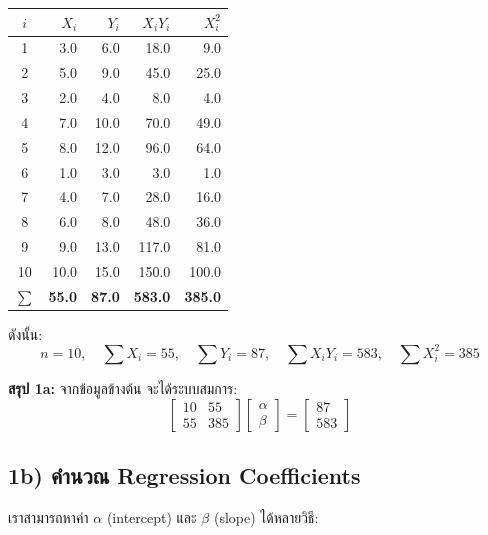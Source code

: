 \documentclass[12pt,a4paper]{article}
\begin{document}
\begin{table}[H]
\centering
\begin{tabular}{c r r r r}
\toprule
$i$ & $X_i$ & $Y_i$ & $X_i Y_i$ & $X_i^2$ \\
\midrule
1  & 3.0  & 6.0  & 18.0   & 9.0   \\
2  & 5.0  & 9.0  & 45.0   & 25.0  \\
3  & 2.0  & 4.0  & 8.0    & 4.0   \\
4  & 7.0  & 10.0 & 70.0   & 49.0  \\
5  & 8.0  & 12.0 & 96.0   & 64.0  \\
6  & 1.0  & 3.0  & 3.0    & 1.0   \\
7  & 4.0  & 7.0  & 28.0   & 16.0  \\
8  & 6.0  & 8.0  & 48.0   & 36.0  \\
9  & 9.0  & 13.0 & 117.0  & 81.0  \\
10 & 10.0 & 15.0 & 150.0  & 100.0 \\
\midrule
$\sum$ & \textbf{55.0} & \textbf{87.0} & \textbf{583.0} & \textbf{385.0} \\
\bottomrule
\end{tabular}
\end{table}

ดังนั้น:
\[
    n = 10, \quad
    \sum X_i = 55, \quad
    \sum Y_i = 87, \quad
    \sum X_i Y_i = 583, \quad
    \sum X_i^2 = 385
\]

\begin{ansbox}
\textbf{สรุป 1a:} \quad จากข้อมูลข้างต้น จะได้ระบบสมการ:
\[
    \begin{bmatrix}
        10 & 55 \\
        55 & 385
    \end{bmatrix}
    \begin{bmatrix}
        \alpha \\
        \beta
    \end{bmatrix}
    =
    \begin{bmatrix}
        87 \\
        583
    \end{bmatrix}
\]
\end{ansbox}

\subsection*{1b) คำนวณ Regression Coefficients}

เราสามารถหาค่า $\alpha$ (intercept) และ $\beta$ (slope) ได้หลายวิธี:
\end{document}
